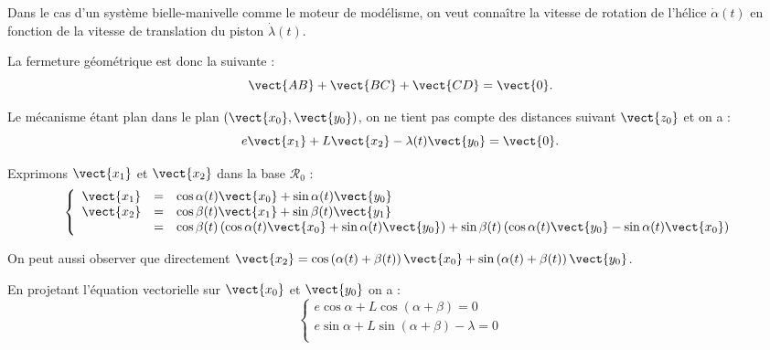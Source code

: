 \ifprof 
\begin{corrige} 

Dans le cas d'un système bielle-manivelle comme le moteur de modélisme, on veut connaître la vitesse de rotation de l'hélice $\dot{\alpha}(t)$ en fonction de la vitesse de translation du piston $\dot{\lambda}(t)$. 

La fermeture géométrique est donc la suivante : 
$$\vect{AB} + \vect{BC} +\vect{CD} = \vect{0}.$$

Le mécanisme étant plan dans le plan $\left(\vect{x_0},\vect{y_0}\right)$, on ne tient pas compte des distances suivant $\vect{z_0}$ et on a : 
$$e\vect{x_1}+L\vect{x_2}-\lambda(t)\vect{y_0}= \vect{0}.$$



Exprimons $\vect{x_1}$ et $\vect{x_2}$ dans la base $\mathcal{R}_0$ :
$$
\left\{
\begin{array}{lcl}
\vect{x_1} & = & \cos \alpha(t) \vect{x_0} + \sin \alpha(t) \vect{y_0} \\
\vect{x_2} & = & \cos \beta(t) \vect{x_1} + \sin \beta(t) \vect{y_1} \\
 & = & \cos \beta(t) \left( \cos \alpha(t) \vect{x_0} + \sin \alpha(t) \vect{y_0} \right) + 
\sin \beta(t) \left( \cos \alpha(t) \vect{y_0} - \sin \alpha(t) \vect{x_0} \right) \\
\end{array}
\right.
$$

On peut aussi observer que directement 
$\vect{x_2} =\cos\left(\alpha(t)+\beta(t) \right)\vect{x_0} + \sin\left(\alpha(t)+\beta(t) \right)\vect{y_0}$.

En projetant l'équation vectorielle sur $\vect{x_0}$ et $\vect{y_0}$ on a : 
$$
\left\{
\begin{array}{l}
e\cos\alpha+ L \cos\left(\alpha+\beta\right)  = 0 \\
e\sin\alpha +  L \sin\left(\alpha+\beta \right) - \lambda= 0 \\
\end{array}
\right.
$$


\end{corrige}
